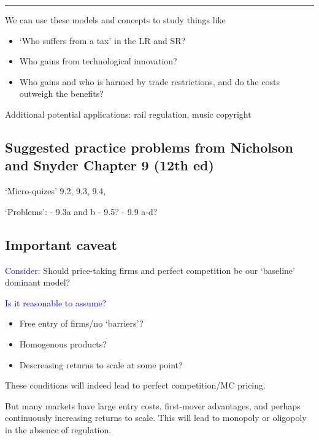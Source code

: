 \documentclass[]{article}
\providecommand{\tightlist}{%
  \setlength{\itemsep}{0pt}\setlength{\parskip}{0pt}}
\begin{document}
\begin{center}\rule{0.5\linewidth}{\linethickness}\end{center}

We can use these models and concepts to study things like

\begin{itemize}
\tightlist
\item
  `Who suffers from a tax' in the LR and SR?
\item
  Who gains from technological innovation?
\item
  Who gains and who is harmed by trade restrictions, and do the costs outweigh the benefits?
\end{itemize}

Additional potential applications: rail regulation, music copyright

\hypertarget{suggested-practice-problems-from-nicholson-and-snyder-chapter-9-12th-ed}{%
\subsection{Suggested practice problems from Nicholson and Snyder Chapter 9 (12th ed)}\label{suggested-practice-problems-from-nicholson-and-snyder-chapter-9-12th-ed}}

`Micro-quizes'
9.2, 9.3, 9.4,

`Problems':
- 9.3a and b
- 9.5?
- 9.9 a-d?

\hypertarget{important-caveat}{%
\subsection{Important caveat}\label{important-caveat}}

\textcolor{blue}{Consider:} Should price-taking firms and perfect competition be our `baseline' dominant model?

\textcolor{blue}{Is it reasonable to assume?}

\begin{itemize}
\item
  Free entry of firms/no `barriers'?
\item
  Homogenous products?
\item
  Descreasing returns to scale at some point?
\end{itemize}

These conditions will indeed lead to perfect competition/MC pricing.

But many markets have large entry costs, first-mover advantages, and perhaps continuously increasing returns to scale. This will lead to monopoly or oligopoly in the absence of regulation.
\end{document}
